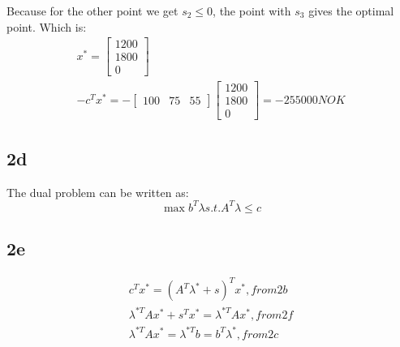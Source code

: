 Because for the other point we get $s_2 \leq 0$, the point with $s_3$ gives the optimal point.
Which is:
\begin{subequations}
    \begin{align}
        x^* = \begin{bmatrix}
            1200\\1800\\0
        \end{bmatrix}\\ 
        -c^T x^* = -\begin{bmatrix}
            100 & 75 & 55
        \end{bmatrix}\begin{bmatrix}
            1200\\1800\\0
        \end{bmatrix}=-255000 NOK
    \end{align}
\end{subequations}

\subsection{2d}
The dual problem can be written as:
\begin{equation}
    \max{b^T \lambda} s.t. A^T \lambda \leq c
\end{equation}

\subsection{2e}
\begin{subequations}
    \begin{align}
        c^T x^* = (A^T \lambda^* + s)^Tx^* , from 2b \\ 
        \lambda^{*T} Ax^* + s^T x^* = \lambda^{*T} Ax^*, from 2f \\ 
        \lambda^{*T} Ax^* = \lambda^{*T} b = b^T \lambda^*, from 2c
    \end{align}
\end{subequations}